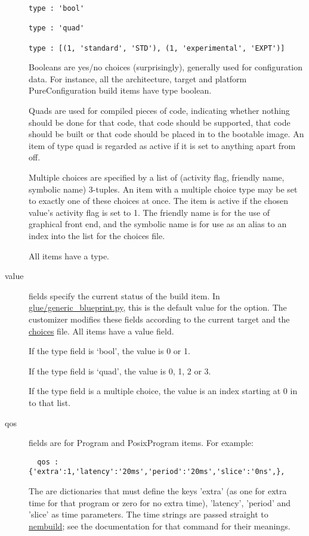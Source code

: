 \documentclass[a4paper]{article}
\begin{document}
\begin{description}
\begin{verbatim}
type : 'bool'

type : 'quad'

type : [(1, 'standard', 'STD'), (1, 'experimental', 'EXPT')]
\end{verbatim}

Booleans are yes/no choices (surprisingly), generally used for
configuration data. For instance, all the architecture, target and
platform PureConfiguration build items have type boolean. 

Quads are used for compiled pieces of code, indicating whether
nothing should be done for that code, that code should be supported,
that code should be built or that code should be placed in to the
bootable image. An item of type quad is regarded as active if it is set
to anything apart from off.

Multiple choices are specified by a list of (activity flag, friendly
name, symbolic name) 3-tuples. An item with a multiple choice type may
be set to exactly one of these choices at once. The item is active if the
chosen value's activity flag is set to 1. The friendly name is for the use of
graphical front end, and the symbolic name is for use as an alias to
an index into the list for the choices file.

All items have a type.


\item[value] fields specify the current status of the build item. In
\url{glue/generic_blueprint.py}, this is the default value for the
option. The customizer modifies these fields according to the current
target and the \url{choices} file. All items have a value field.

If the type field is `bool', the value is 0 or 1.

If the type field is `quad', the value is 0, 1, 2 or 3.

If the type field is a multiple choice, the value is an index starting
at 0 in to that list.


\item[qos] fields are for Program and PosixProgram items.  For example:

\begin{verbatim}
  qos : {'extra':1,'latency':'20ms','period':'20ms','slice':'0ns',},
\end{verbatim}

The are dictionaries that must define the keys 'extra' (as one for
extra time for that program or zero for no extra time), 'latency',
'period' and 'slice' as time parameters. The time strings are passed
straight to \url{nembuild}; see the documentation for that command for
their meanings.
\end{description}
\end{document}
